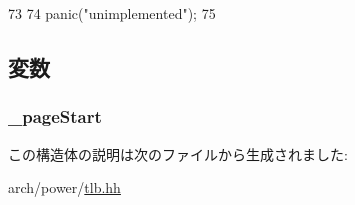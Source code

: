 \begin{DoxyCode}
73     {
74         panic("unimplemented");
75     }
\end{DoxyCode}


\subsection{変数}
\hypertarget{structPowerISA_1_1TlbEntry_ad8da2710e276585b6631902816b5284f}{
\subsubsection[{\_\-pageStart}]{ {\bf \_\-pageStart}}}
\label{structPowerISA_1_1TlbEntry_ad8da2710e276585b6631902816b5284f}


この構造体の説明は次のファイルから生成されました:\begin{DoxyCompactItemize}
\item 
arch/power/\hyperlink{arch_2power_2tlb_8hh}{tlb.hh}\end{DoxyCompactItemize}
